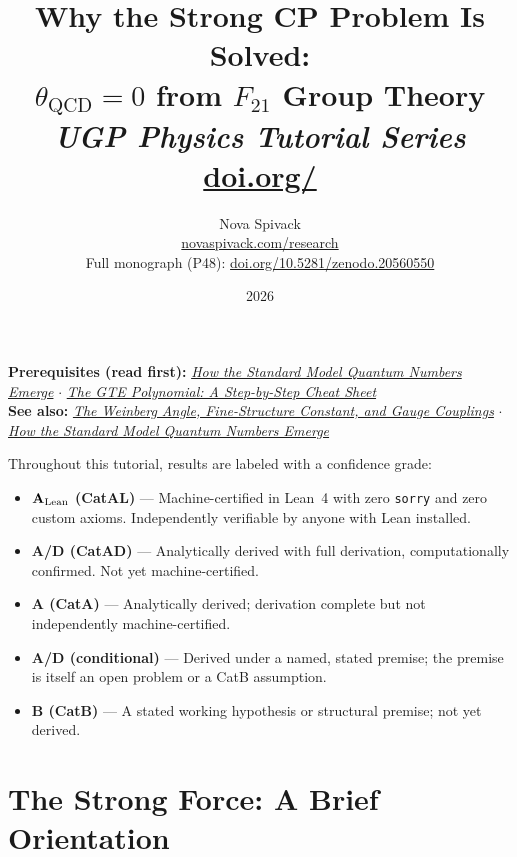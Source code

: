 \documentclass[11pt,a4paper]{article}
\title{\textbf{Why the Strong CP Problem Is Solved:}\\[6pt]
\large $\theta_{\mathrm{QCD}} = 0$ from $F_{21}$ Group Theory\\[4pt]\normalsize\textit{UGP Physics Tutorial Series}
\\[2pt]\small\href{https://doi.org/\TutorialDOI}{doi.org/\TutorialDOI}}
\author{Nova Spivack\\[4pt]
\normalsize
\href{https://novaspivack.com/research}{novaspivack.com/research}\\[2pt]
\small Full monograph (P48):
\href{https://doi.org/10.5281/zenodo.20560550}{doi.org/10.5281/zenodo.20560550}
}
\date{2026}
\begin{document}
\setcounter{tocdepth}{2}
\maketitle
\tableofcontents
\newpage

\begin{tcolorbox}[colback=blue!6,colframe=blue!40!black,
  title=\textbf{UGP Physics Tutorial Series}]
\textbf{Prerequisites (read first):} \href{https://doi.org/10.5281/zenodo.20657898}{\emph{How the Standard Model Quantum Numbers Emerge}} $\cdot$ \href{https://doi.org/10.5281/zenodo.20657889}{\emph{The GTE Polynomial: A Step-by-Step Cheat Sheet}}\\[4pt]
\textbf{See also:} \href{https://doi.org/10.5281/zenodo.20657923}{\emph{The Weinberg Angle, Fine-Structure Constant, and Gauge Couplings}} $\cdot$ \href{https://doi.org/10.5281/zenodo.20657898}{\emph{How the Standard Model Quantum Numbers Emerge}}
\end{tcolorbox}

\begin{tcolorbox}[colback=boxgreen,colframe=green!50!black,
  title=\textbf{Claim-Strength Taxonomy}]
Throughout this tutorial, results are labeled with a confidence grade:
\begin{itemize}[itemsep=2pt]
  \item \textbf{$\mathbf{A}_{\rm Lean}$ (CatAL)} --- Machine-certified in Lean~4 with zero \texttt{sorry} and zero custom axioms.  Independently verifiable by anyone with Lean installed.
  \item \textbf{A/D (CatAD)} --- Analytically derived with full derivation, computationally confirmed.  Not yet machine-certified.
  \item \textbf{A (CatA)} --- Analytically derived; derivation complete but not independently machine-certified.
  \item \textbf{A/D (conditional)} --- Derived under a named, stated premise; the premise is itself an open problem or a CatB assumption.
  \item \textbf{B (CatB)} --- A stated working hypothesis or structural premise; not yet derived.
\end{itemize}
\end{tcolorbox}


\section{The Strong Force: A Brief Orientation}
\end{document}
